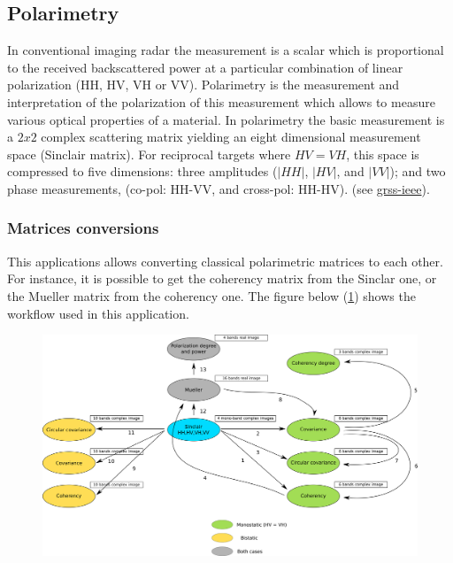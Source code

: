 \subsection{Polarimetry}

In conventional imaging radar the measurement is a scalar which is 
proportional to the received backscattered power at a particular combination 
of linear polarization (HH, HV, VH or VV). 
Polarimetry is the measurement and interpretation of the polarization of this measurement which
allows to measure various optical properties of a material.
In polarimetry the basic measurement is a $2x2$ complex scattering
matrix yielding an eight dimensional measurement space (Sinclair
matrix). For reciprocal targets where $HV=VH$, this space is
compressed to five dimensions: three amplitudes ($|HH|$, $|HV|$, and
$|VV|$); and two phase measurements, (co-pol: HH-VV, and cross-pol:
HH-HV). (see \href{http://www.grss-ieee.org/technical-briefs/imaging-radar-polarimetry}{grss-ieee}).

\subsubsection{Matrices conversions}

This applications allows converting classical polarimetric matrices to each other.
For instance, it is possible to get the coherency matrix from the Sinclar one, or the Mueller matrix from the coherency one.
The figure below (\ref{fig:polconv}) shows the workflow used in this application.

\begin{figure}[h!]
  \centering
   \includegraphics[width=\textwidth]{../Art/sarpol_conversion_schema.png}
  \label{fig:polconv}
\end{figure}

